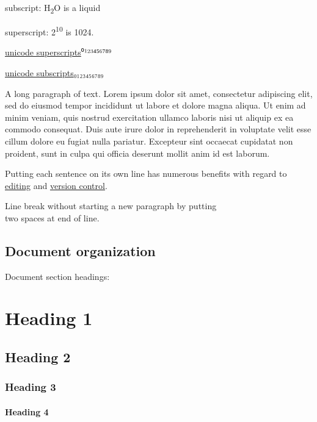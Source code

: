 subscript: H\textsubscript{2}O is a liquid

superscript: 2\textsuperscript{10} is 1024.

\href{https://www.google.com/search?q=superscript+generator}{unicode superscripts}⁰¹²³⁴⁵⁶⁷⁸⁹

\href{https://www.google.com/search?q=superscript+generator}{unicode subscripts}₀₁₂₃₄₅₆₇₈₉

A long paragraph of text.
Lorem ipsum dolor sit amet, consectetur adipiscing elit, sed do eiusmod tempor incididunt ut labore et dolore magna aliqua.
Ut enim ad minim veniam, quis nostrud exercitation ullamco laboris nisi ut aliquip ex ea commodo consequat.
Duis aute irure dolor in reprehenderit in voluptate velit esse cillum dolore eu fugiat nulla pariatur.
Excepteur sint occaecat cupidatat non proident, sunt in culpa qui officia deserunt mollit anim id est laborum.

Putting each sentence on its own line has numerous benefits with regard to \href{https://asciidoctor.org/docs/asciidoc-recommended-practices/\#one-sentence-per-line}{editing} and \href{https://rhodesmill.org/brandon/2012/one-sentence-per-line/}{version control}.

Line break without starting a new paragraph by putting\\
two spaces at end of line.

\hypertarget{document-organization}{%
\subsection{Document organization}\label{document-organization}}

Document section headings:

\hypertarget{heading-1}{%
\section{Heading 1}\label{heading-1}}

\hypertarget{heading-2}{%
\subsection{Heading 2}\label{heading-2}}

\hypertarget{heading-3}{%
\subsubsection{Heading 3}\label{heading-3}}

\hypertarget{heading-4}{%
\paragraph{Heading 4}\label{heading-4}}

